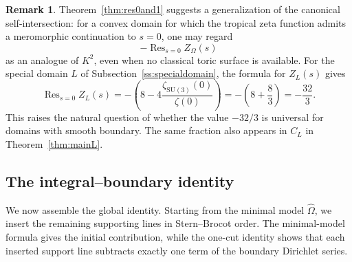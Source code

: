 \documentclass[a4paper,american,11pt]{amsart}
\theoremstyle{plain}
\theoremstyle{definition}
\newtheorem{remark}[theorem]{Remark}
\DeclareMathOperator*{\Res}{Res}
\begin{document}
\begin{remark}
Theorem~\ref{thm:res0and1} suggests a generalization of the canonical
self-intersection: for a convex domain for which the tropical zeta function
admits a meromorphic continuation to \(s=0\), one may regard
\[
-\Res_{s=0}Z_\Omega(s)
\]
as an analogue of \(K^2\), even when no classical toric surface is available.
For the special domain \(L\) of Subsection~\ref{ss:specialdomain}, the formula
for \(Z_L(s)\) gives
\[
\Res_{s=0}Z_L(s)
=
-\left(
8-4\frac{\zeta_{\mathrm{SU}(3)}(0)}{\zeta(0)}
\right)
=
-\left(8+\frac83\right)
=
-\frac{32}{3}.
\]
This raises the natural question of whether the value \(-32/3\) is universal
for domains with smooth boundary. The same fraction also appears in \(C_L\)
in Theorem~\ref{thm:mainL}.
\end{remark}

\subsection{The integral--boundary identity}\label{subsec:integral-boundary}

We now assemble the global identity. Starting from the minimal model
\(\widehat\Omega\), we insert the remaining supporting lines in
Stern--Brocot order. The minimal-model formula gives the initial
contribution, while the one-cut identity shows that each inserted support
line subtracts exactly one term of the boundary Dirichlet series.
\end{document}
